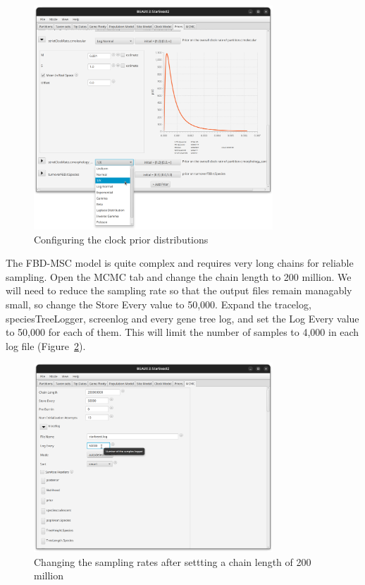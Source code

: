 \documentclass[12pt]{article}
\begin{document}
\begin{figure}[htb!]
\centering
\includegraphics[width=0.8\textwidth]{figures/clockPriors.png}
\caption
{Configuring the clock prior distributions}
\label{fig:clockPriors}
\end{figure}

The FBD-MSC model is quite complex and requires very long chains for
reliable sampling. Open the MCMC tab and change the chain length to 200
million. We will need to reduce the sampling rate so that the output files remain
managably small, so change the Store Every value to 50,000. Expand the
tracelog, speciesTreeLogger, screenlog and every gene tree log, and set the
Log Every value to 50,000 for each of them. This will limit the number of
samples to 4,000 in each log file (Figure~\ref{fig:samplingRate}).

\begin{figure}[htb!]
\centering
\includegraphics[width=0.8\textwidth]{figures/samplingRate.png}
\caption
{Changing the sampling rates after settting a chain length of 200 million}
\label{fig:samplingRate}
\end{figure}
\end{document}

